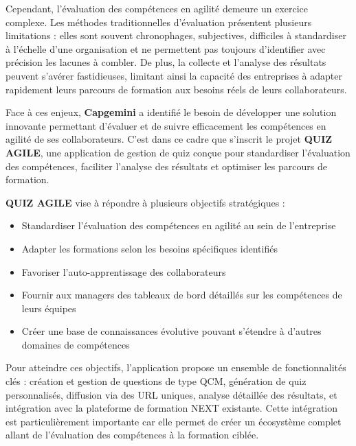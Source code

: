 \documentclass[12pt,a4paper]{report}
\begin{document}
\medskip
\noindent
Cependant, l'évaluation des compétences en agilité
demeure un exercice complexe. Les méthodes traditionnelles
d'évaluation présentent plusieurs limitations : elles
sont souvent chronophages, subjectives, difficiles à standardiser à
l'échelle d'une organisation et ne
permettent pas toujours d'identifier avec précision les
lacunes à combler. De plus, la collecte et l'analyse des
résultats peuvent s'avérer fastidieuses, limitant ainsi
la capacité des entreprises à adapter rapidement leurs parcours de
formation aux besoins réels de leurs collaborateurs.

\medskip
\noindent
Face à ces enjeux, \textbf{Capgemini} a identifié le besoin de
développer une solution innovante permettant d'évaluer
et de suivre efficacement les compétences en agilité de ses
collaborateurs. C'est dans ce cadre que
s'inscrit le projet \textbf{QUIZ AGILE}, une application
de gestion de quiz conçue pour standardiser l'évaluation
des compétences, faciliter l'analyse des résultats et
optimiser les parcours de formation.

\medskip
\noindent
\textbf{QUIZ AGILE} vise à répondre à plusieurs objectifs stratégiques :

\begin{itemize}
    \item Standardiser l'évaluation des compétences en agilité au sein de l'entreprise
    \item Adapter les formations selon les besoins spécifiques identifiés
    \item Favoriser l'auto-apprentissage des collaborateurs
    \item Fournir aux managers des tableaux de bord détaillés sur les compétences de leurs équipes
    \item Créer une base de connaissances évolutive pouvant s'étendre à d'autres domaines de compétences
\end{itemize}

\medskip
\noindent
Pour atteindre ces objectifs, l'application propose un
ensemble de fonctionnalités clés : création et gestion de questions de
type QCM, génération de quiz personnalisés, diffusion via des URL
uniques, analyse détaillée des résultats, et intégration avec la
plateforme de formation NEXT existante. Cette intégration est
particulièrement importante car elle permet de créer un écosystème
complet allant de l'évaluation des compétences à la
formation ciblée.
\end{document}

